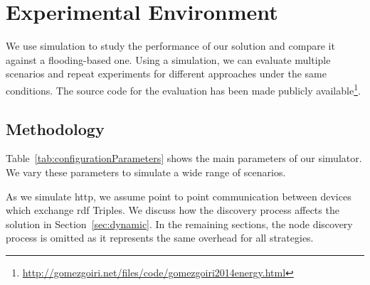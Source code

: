 \section{Experimental Environment}
\label{environment}
We use simulation to study the performance of our solution and compare it against a flooding-based one.
Using a simulation, we can evaluate multiple scenarios and repeat experiments for different approaches under the same conditions.
The source code for the evaluation has been made publicly available\footnote{\url{http://gomezgoiri.net/files/code/gomezgoiri2014energy.html}}.

\subsection{Methodology}
Table~\ref{tab:configurationParameters} shows the main parameters of our simulator.
We vary these parameters to simulate a wide range of scenarios.





As we simulate \ac{http}, we assume point to point communication between devices which exchange \ac{rdf} Triples.
We discuss how the discovery process affects the solution in Section~\ref{sec:dynamic}.
In the remaining sections, the node discovery process is omitted as it represents the same overhead for all strategies.


